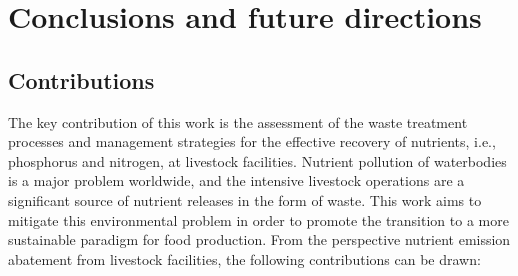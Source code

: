 \chapter{Conclusions and future directions}\label{ch:Conclusions}

\section{Contributions}
The key contribution of this work is the assessment of the waste treatment processes and management strategies for the effective recovery of nutrients, i.e., phosphorus and nitrogen, at livestock facilities. Nutrient pollution of waterbodies is a major problem worldwide, and the intensive livestock operations are a significant source of nutrient releases in the form of waste. This work aims to mitigate this environmental problem in order to promote the transition to a more sustainable paradigm for food production. From the perspective nutrient emission abatement from livestock facilities, the following contributions can be drawn:

